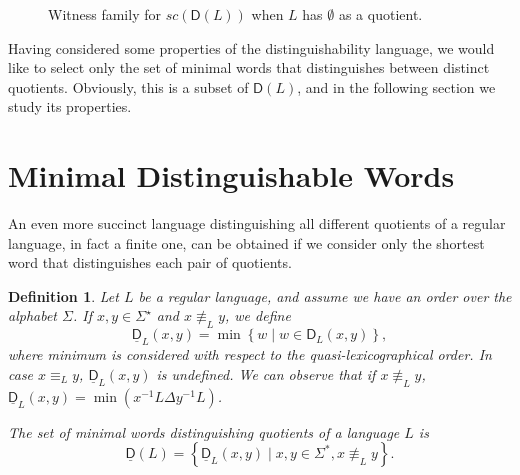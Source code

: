 \documentclass{article}
\newtheorem{definition}{Definition}
\newcommand{\disw}[2]{\mathsf{D}_{#1}(#2)}
\newcommand{\dis}[1]{\mathsf{D}(#1)}
\newcommand{\distminw}[2]{\underline{\mathsf{D}}_{#1}(#2)}
\newcommand{\distmin}[1]{\underline{\mathsf{D}}(#1)}
\newcommand{\mneq}[1]{\equiv_{#1}}
\newcommand{\Set}[1]{\left\{ #1 \right\}}
\begin{document}
\begin{figure}[h!]
\begin{center}
 \end{center}
\caption{Witness family for  $sc(\dis{L})$ when $L$ has $\emptyset$ as a quotient.} 
\label{fig:upsuffe} 
\end{figure}
Having considered some  properties of the distinguishability language,
we would like  to select only the set of minimal words that
distinguishes between distinct quotients. Obviously, 
this is a subset of $\dis{L}$, and in the following  section we study its properties.

\section{Minimal Distinguishable Words}
\label{sec:minDist}
An even more succinct language distinguishing all different quotients
of a regular language, in fact a finite one, can be obtained if we
consider only the shortest word that distinguishes each pair of
quotients.  

\begin{definition}
\label{def:distmin}  
    Let $L$ be a regular language, and assume we have an order over 
the alphabet $\Sigma$.
If $x,y\in \Sigma^\star$ and $x\not\mneq{L} y$, 
 we define 
$$
\distminw{L}{x,y} = 
    \min\Set{w\mid w\in \disw{L}{x,y}},
$$
where minimum is considered with respect to the quasi-lexicographical order.
In case   $x\mneq{L} y$, $\distminw{L}{x,y}$ is undefined.
We can observe that if $x\not\mneq{L} y$, 
$\distminw{L}{x,y}=\min (x^{-1}L\Delta y^{-1}L)$.


 The set of minimal words distinguishing quotients of a language $L$ 
is 
$$
\distmin{L} = \Set{\distminw{L}{x,y} \mid  x,y\in \Sigma^*, x\not\mneq{L} y}.
$$
\end{definition}
 
\end{document}
